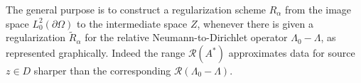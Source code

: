 \documentclass[10pt, a4paper, twoside, openright]{book}
\theoremstyle{definition}
\theoremstyle{plain}
\theoremstyle{plain}
\theoremstyle{plain}
\theoremstyle{plain}
\theoremstyle{plain}
\theoremstyle{plain}
\theoremstyle{plain}
\theoremstyle{plain}
\let\phi\varphi
\begin{document}
The general purpose is to construct a regularization scheme  $R_\alpha$ from the image space $L^2_0(\partial\Omega)$ to the intermediate space $Z$, whenever there is given a regularization $\tilde{R}_\alpha$ for the relative Neumann-to-Dirichlet operator $\Lambda_0-\Lambda$, as represented graphically. Indeed the range $\mathcal{R}(A^*)$ approximates data for source $z\in D$ sharper than the corresponding $\mathcal{R}(\Lambda_0 -\Lambda)$.
\end{document}
